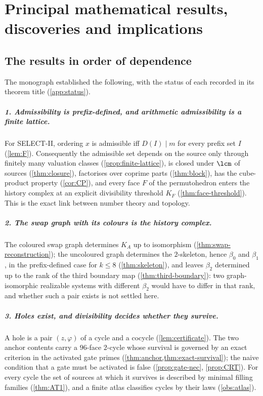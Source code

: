 \chapter{Principal mathematical results, discoveries and implications}\label{ch:synthesis}

\section{The results in order of dependence}\label{sec:results}
The monograph established the following, with the status of each recorded in its theorem title (\cref{app:status}).

\paragraph{1. Admissibility is prefix-defined, and arithmetic admissibility is a finite lattice.} For SELECT-II, ordering $x$ is admissible iff $D(I)\mid m$ for every prefix set $I$ (\cref{lem:F}). Consequently the admissible set depends on the source only through finitely many valuation classes (\cref{prop:finite-lattice}), is closed under $\lcm$ of sources (\cref{thm:closure}), factorises over coprime parts (\cref{thm:block}), has the cube-product property (\cref{cor:CP}), and every face $F$ of the permutohedron enters the history complex at an explicit divisibility threshold $K_F$ (\cref{thm:face-threshold}). This is the exact link between number theory and topology.

\paragraph{2. The swap graph with its colours is the history complex.} The coloured swap graph determines $K_A$ up to isomorphism (\cref{thm:swap-reconstruction}); the uncoloured graph determines the $2$-skeleton, hence $\beta_0$ and $\beta_1$, in the prefix-defined case for $k\le8$ (\cref{thm:skeleton}), and leaves $\beta_2$ determined up to the rank of the third boundary map (\cref{thm:third-boundary}): two graph-isomorphic realizable systems with different $\beta_2$ would have to differ in that rank, and whether such a pair exists is not settled here.

\paragraph{3. Holes exist, and divisibility decides whether they survive.} A hole is a pair $(z,\varphi)$ of a cycle and a cocycle (\cref{lem:certificate}). The two anchor contents carry a $96$-face $2$-cycle whose survival is governed by an exact criterion in the activated gate primes (\cref{thm:anchor,thm:exact-survival}); the naive condition that a gate must be activated is false (\cref{prop:gate-nec}, \cref{prop:CRT}). For every cycle the set of sources at which it survives is described by minimal filling families (\cref{thm:AT1}), and a finite atlas classifies cycles by their laws (\cref{obs:atlas}).

